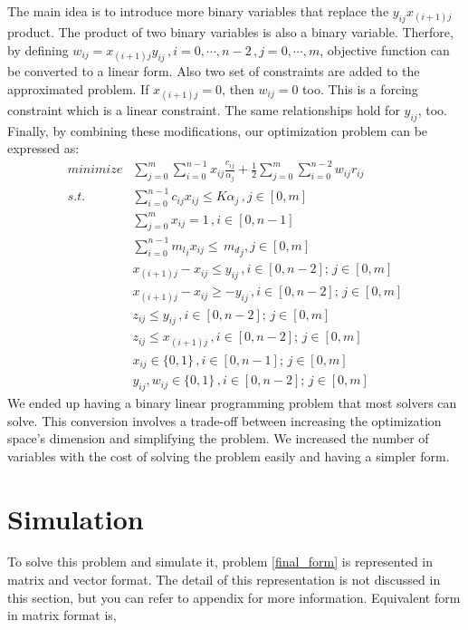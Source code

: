 \documentclass[lettersize,journal]{IEEEtran}
\begin{document}
The main idea is to introduce more binary variables that replace the $y_{ij}x_{(i+1)j}$ product. The product of two binary variables is also a binary variable. Therfore, by defining $w_{ij} = x_{(i+1)j}y_{ij} \, , i=0,\cdots,n-2 \, , j=0,\cdots,m$, objective function can be converted to a linear form. Also two set of constraints are added to the approximated problem. If $x_{(i+1)j} = 0$, then $w_{ij} = 0$ too. This is a forcing constraint which is a linear constraint. The same relationships hold for $y_{ij}$, too. Finally, by combining these modifications, our optimization problem can be expressed as:
\begin{align}
\label{final_form}
minimize &\sum_{j=0}^{m}\sum_{i=0}^{n-1} x_{ij}\frac{c_{ij}}{\alpha_j} + \frac{1}{2}\sum_{j=0}^{m} \sum_{i=0}^{n-2} w_{ij} r_{ij} \\
s.t. \quad & \sum_{i=0}^{n-1} c_{ij} x_{ij} \leq K \alpha_j \, , j \in [0, m] \nonumber \\
\quad & \sum_{j=0}^{m} x_{ij} = 1 \, , i \in [0, n-1] \nonumber \\
\quad & \sum_{i=0}^{n-1} {m_l}_i x_{ij} \leq \, {m_d}_j  , j \in [0, m] \nonumber \\
\quad & x_{(i+1)j}-x_{ij} \leq y_{ij} \, , i \in [0, n-2]; \, j \in [0,m]  \nonumber \\
\quad & x_{(i+1)j}-x_{ij} \geq -y_{ij} \, , i \in [0, n-2]; \, j \in[0,m]  \nonumber \\
\quad & z_{ij} \leq y_{ij} \, , i \in [0, n-2]; \, j \in [0, m]  \nonumber \\
\quad & z_{ij} \leq x_{(i+1)j} \, , i \in [0, n-2]; \, j \in [0, m]  \nonumber \\
\quad & x_{ij} \in \{0,1\} \, , i \in [0, n-1]; \, j \in [0,m] \nonumber \\
\quad & y_{ij}, w_{ij} \in \{0,1\} \, , i \in [0, n-2]; \, j \in [0,m] \nonumber
\end{align}
We ended up having a binary linear programming problem that most solvers can solve. This conversion involves a trade-off between increasing the optimization space's dimension and simplifying the problem. We increased the number of variables with the cost of solving the problem easily and having a simpler form.

\section{Simulation}
To solve this problem and simulate it, problem \ref{final_form} is represented in matrix and vector format. The detail of this representation is not discussed in this section, but you can refer to appendix for more information. Equivalent form in matrix format is,
\end{document}
